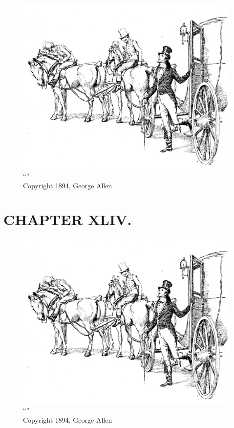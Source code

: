 \begin{figure}[htbp]
    \centering
    \includegraphics[width=\textwidth]{illustrations/i_031.jpg}
    \caption{“”\\ Copyright 1894, George Allen}
    \label{fig:image}
\end{figure}


\chapter{CHAPTER XLIV.}

\begin{figure}[htbp]
    \centering
    \includegraphics[width=\textwidth]{illustrations/i_031.jpg}
    \caption{“”\\ Copyright 1894, George Allen}
    \label{fig:image}
\end{figure}


